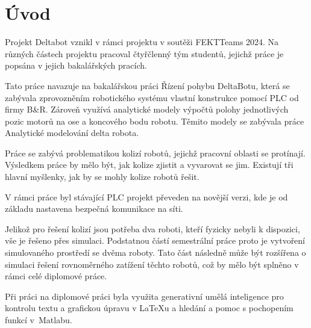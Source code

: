 \chapter*{Úvod}
{}
Projekt Deltabot vznikl v rámci projektu v soutěži FEKTTeams 2024. Na různých částech
projektu pracoval čtyřčlenný tým studentů, jejichž práce je popsána v jejich bakalářských 
pracích. 

Tato práce navazuje na bakalářskou práci Řízení pohybu DeltaBotu, která se zabývala
zprovozněním robotického systému vlastní konstrukce pomocí PLC od firmy B\&R.
Zároveň využívá analytické modely výpočtů polohy jednotlivých pozic motorů na ose
a koncového bodu robotu. Těmito modely se zabývala práce Analytické modelování delta
robota.

Práce se zabývá problematikou kolizí robotů, jejichž pracovní oblasti se protínají.
Výsledkem práce by mělo být, jak kolize zjistit a vyvarovat se jim. Existují tři hlavní
myšlenky, jak by se mohly kolize robotů řešit.

V rámci práce byl stávající PLC projekt převeden na novější verzi, kde je od základu
nastavena bezpečná komunikace na síti.

 

Jelikož pro řešení kolizí jsou potřeba dva roboti, kteří fyzicky nebyli k dispozici,
vše je řešeno přes simulaci. Podstatnou částí semestrální práce proto je vytvoření
simulovaného prostředí se dvěma roboty. Tato část následně může být rozšířena o
simulaci řešení rovnoměrného zatížení těchto robotů, což by mělo být splněno v rámci
celé diplomové práce.

Při práci na diplomové práci byla využita generativní umělá inteligence
pro kontrolu textu a grafickou úpravu v LaTeXu a hledání a pomoc s pochopením
funkcí v~Matlabu. 







%

